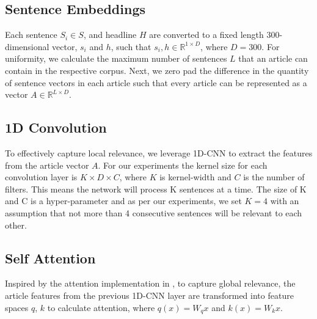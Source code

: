 \documentclass[11pt,a4paper]{article}
\begin{document}
\subsection{Sentence Embeddings}
Each sentence $S_i \in S$, and headline $H$ are converted to a fixed length 300-dimensional vector, $s_i$ and $h$, such that $s_{i}, h \in \mathbb{R}^{1 \times D}$, where $D = 300$. For uniformity, we calculate the maximum number of sentences $L$ that an article can contain in the respective corpus. Next, we zero pad the difference in the quantity of sentence vectors in each article such that every article can be represented as a vector $A \in \mathbb{R}^{L \times D}$.


\subsection{1D Convolution}
To effectively capture local relevance, we leverage 1D-CNN \cite{lecun1998gradient} to extract the features from the article vector $A$. For our experiments the kernel size for each convolution layer is $K \times D \times C$, where $K$ is kernel-width and $C$ is the number of filters. This means the network will process K sentences at a time. The size of K and C is a hyper-parameter and as per our experiments, we set $K=4$ with an assumption that not more than 4 consecutive sentences will be relevant to each other.

\subsection{Self Attention}
\label{subsection:self_attention}
Inspired by the attention implementation in \cite{zhang2018selfattention, vaswani_attention_2017}, to capture global relevance, the article features from the previous 1D-CNN layer are transformed into feature spaces $q$, $k$ to calculate attention, where $q(x) = W_qx$ and $k(x) = W_kx$. 
\end{document}
